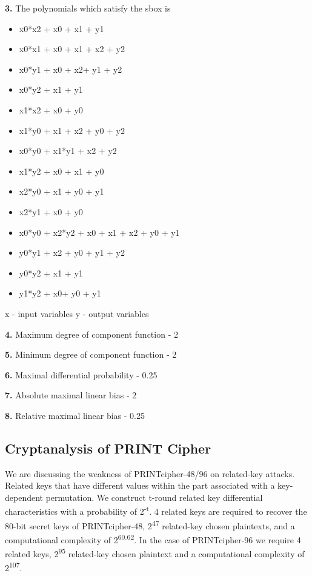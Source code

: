 \documentclass[journal=tosc,preprint]{iacrtrans}
\begin{document}
\noindent\textbf{3. } The polynomials which satisfy the sbox is
\begin{itemize}
	\item x0*x2 + x0 + x1 + y1
	\item x0*x1 + x0 + x1 + x2 + y2
	\item x0*y1 + x0 + x2+ y1 + y2
	\item x0*y2 + x1 + y1
	\item x1*x2 + x0 + y0
	\item x1*y0 + x1 + x2 + y0 + y2
	\item x0*y0 + x1*y1 + x2 + y2
	\item x1*y2 + x0 + x1 + y0
	\item x2*y0 + x1 + y0 + y1
	\item x2*y1 + x0 + y0
	\item x0*y0 + x2*y2 + x0 + x1 + x2 + y0 + y1
	\item y0*y1 + x2 + y0 + y1 + y2
	\item y0*y2 + x1 + y1
	\item y1*y2 + x0+ y0 + y1
\end{itemize}
\hspace{0.5cm} x - input variables y - output variables \newline

\noindent\textbf{4.} Maximum degree of component function - 2\newline

\noindent\textbf{5.} Minimum degree of component function - 2\newline

\noindent\textbf{6.} Maximal differential probability - 0.25\newline

\noindent\textbf{7.} Absolute maximal linear bias - 2\newline

\noindent\textbf{8.} Relative maximal linear bias - 0.25\newline

\subsection{Cryptanalysis of PRINT Cipher}
We are discussing the weakness of PRINTcipher-48/96 on related-key attacks.
Related keys that have different values within the part associated with a key-
dependent permutation. We construct t-round related key differential
characteristics with a probability of 2\textsuperscript{-t}. 4 related keys are required to recover
the 80-bit secret keys of PRINTcipher-48, 2\textsuperscript{47} related-key chosen plaintexts,
and a computational complexity of 2\textsuperscript{60.62}. In the case of PRINTcipher-96 we
require 4 related keys, 2\textsuperscript{95} related-key chosen plaintext and a computational
complexity of 2\textsuperscript{107}.
\end{document}
